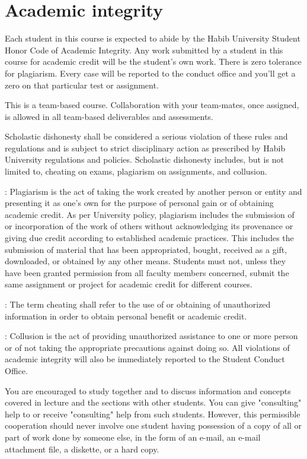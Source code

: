 \documentclass[a4paper]{article}
\newcommand{\new}[1]{{#1}}
\begin{document}
\section{Academic integrity}

Each student in this course is expected to abide by the Habib University Student Honor Code of Academic Integrity.  Any work submitted by a student in this course for academic credit will be the student's own work. There is zero tolerance for plagiarism. Every case will be reported to the conduct office and you'll get a zero on that particular test or assignment.

\new{This is a team-based course. Collaboration with your team-mates, once assigned, is allowed in all team-based deliverables and assessments.}

Scholastic dishonesty shall be considered a serious violation of these rules and regulations and is subject to strict disciplinary action as prescribed by Habib University regulations and policies. Scholastic dishonesty includes, but is not limited to, cheating on exams, plagiarism on assignments, and collusion. 

: Plagiarism is the act of taking the work created by another person or entity and presenting it as one’s own for the purpose of personal gain or of obtaining academic credit. As per University policy, plagiarism includes the submission of or incorporation of the work of others without acknowledging its provenance or giving due credit according to established academic practices. This includes the submission of material that has been appropriated, bought, received as a gift, downloaded, or obtained by any other means. Students must not, unless they have been granted permission from all faculty members concerned, submit the same assignment or project for academic credit for different courses. 

: The term cheating shall refer to the use of or obtaining of unauthorized information in order to obtain personal benefit or academic credit. 

: Collusion is the act of providing unauthorized assistance to one or more person or of not taking the appropriate precautions against doing so. 
All violations of academic integrity will also be immediately reported to the Student Conduct Office.  

You are encouraged to study together and to discuss information and concepts covered in lecture and the sections with other students. You can give "consulting" help to or receive "consulting" help from such students. However, this permissible cooperation should never involve one student having possession of a copy of all or part of work done by someone else, in the form of an e-mail, an e-mail attachment file, a diskette, or a hard copy. 
\end{document}
